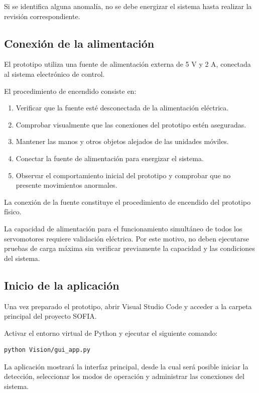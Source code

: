 \documentclass[letterpaper,journal]{IEEEtran}
\begin{document}
Si se identifica alguna anomalía, no se debe
energizar el sistema hasta realizar la revisión
correspondiente.

\subsection{Conexión de la alimentación}

El prototipo utiliza una fuente de alimentación
externa de 5 V y 2 A, conectada al sistema
electrónico de control.

El procedimiento de encendido consiste en:

\begin{enumerate}
    \item Verificar que la fuente esté
    desconectada de la alimentación eléctrica.
    \item Comprobar visualmente que las
    conexiones del prototipo estén aseguradas.
    \item Mantener las manos y otros objetos
    alejados de las unidades móviles.
    \item Conectar la fuente de alimentación
    para energizar el sistema.
    \item Observar el comportamiento inicial
    del prototipo y comprobar que no presente
    movimientos anormales.
\end{enumerate}

La conexión de la fuente constituye el
procedimiento de encendido del prototipo físico.

La capacidad de alimentación para el
funcionamiento simultáneo de todos los
servomotores requiere validación eléctrica.
Por este motivo, no deben ejecutarse pruebas
de carga máxima sin verificar previamente
la capacidad y las condiciones del sistema.

\subsection{Inicio de la aplicación}

Una vez preparado el prototipo, abrir
Visual Studio Code y acceder a la carpeta
principal del proyecto SOFIA.

Activar el entorno virtual de Python y
ejecutar el siguiente comando:

\begin{verbatim}
python Vision/gui_app.py
\end{verbatim}

La aplicación mostrará la interfaz principal,
desde la cual será posible iniciar la detección,
seleccionar los modos de operación y administrar
las conexiones del sistema.
\end{document}
